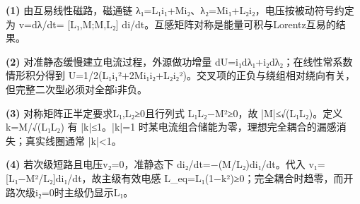 \par\noindent\textbf{(1)} 由互易线性磁路，磁通链 λ₁=L₁i₁+Mi₂、λ₂=Mi₁+L₂i₂，电压按被动符号约定为 v=dλ/dt= [L₁,M;M,L₂] di/dt。互感矩阵对称是能量可积与Lorentz互易的结果。
\par\noindent\textbf{(2)} 对准静态缓慢建立电流过程，外源做功增量 dU=i₁dλ₁+i₂dλ₂；在线性常系数情形积分得到 U=1/2(L₁i₁²+2Mi₁i₂+L₂i₂²)。交叉项的正负与绕组相对绕向有关，但完整二次型必须对全部i非负。
\par\noindent\textbf{(3)} 对称矩阵正半定要求L₁,L₂≥0且行列式 L₁L₂−M²≥0，故 |M|≤√(L₁L₂)。定义 k=M/√(L₁L₂) 有 |k|≤1。|k|=1 时某电流组合储能为零，理想完全耦合的漏感消失；真实线圈通常 |k|<1。
\par\noindent\textbf{(4)} 若次级短路且电压v₂=0，准静态下 di₂/dt=−(M/L₂)di₁/dt。代入 v₁=[L₁−M²/L₂]di₁/dt，故主级有效电感 L\_eq=L₁(1−k²)≥0；完全耦合时趋零，而开路次级i₂=0时主级仍显示L₁。
